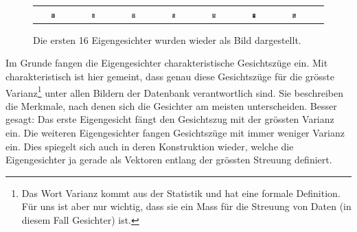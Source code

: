 \begin{figure}[ht]
\begin{tabular}{cccccccc}
		\includegraphics[width=0.1\textwidth]{images/eigenfaces/eigenface09} & \includegraphics[width=0.1\textwidth]{images/eigenfaces/eigenface10} &
		\includegraphics[width=0.1\textwidth]{images/eigenfaces/eigenface11} & \includegraphics[width=0.1\textwidth]{images/eigenfaces/eigenface12} &
		\includegraphics[width=0.1\textwidth]{images/eigenfaces/eigenface13} & \includegraphics[width=0.1\textwidth]{images/eigenfaces/eigenface14} &
		\includegraphics[width=0.1\textwidth]{images/eigenfaces/eigenface15} \\
	\end{tabular}
	\caption{Die ersten 16 Eigengesichter wurden wieder als Bild dargestellt.}
	\label{fig:eigenfaces}
\end{figure}

Im Grunde fangen die Eigengesichter charakteristische Gesichtszüge ein.
Mit charakteristisch ist hier gemeint, dass genau diese Gesichtszüge für die grösste Varianz\footnote{Das Wort \glqq{}Varianz\grqq{} kommt aus der Statistik und hat eine formale Definition. Für uns ist aber nur wichtig, dass sie ein Mass für die Streuung von Daten (in diesem Fall Gesichter) ist.} unter allen Bildern der Datenbank verantwortlich sind.
Sie beschreiben die Merkmale, nach denen sich die Gesichter am meisten unterscheiden.
Besser gesagt: Das erste Eigengesicht fängt den Gesichtszug mit der grössten Varianz ein.
Die weiteren Eigengesichter fangen Gesichtszüge mit immer weniger Varianz ein.
Dies spiegelt sich auch in deren Konstruktion wieder, welche die Eigengesichter ja gerade als Vektoren entlang der grössten Streuung definiert.